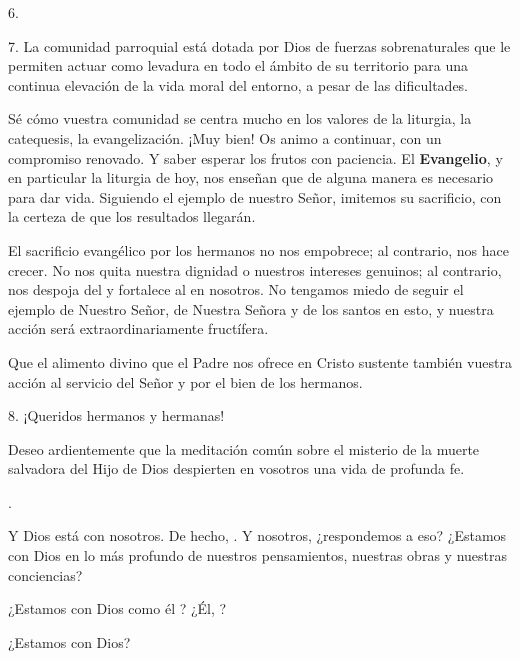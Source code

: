 \begin{body}
6. 

7. La comunidad parroquial está dotada por Dios de fuerzas sobrenaturales que le permiten actuar como levadura en todo el ámbito de su territorio para una continua elevación de la vida moral del entorno, a pesar de las dificultades.

Sé cómo vuestra comunidad se centra mucho en los valores de la liturgia, la catequesis, la evangelización. ¡Muy bien! Os animo a continuar, con un compromiso renovado. Y saber esperar los frutos con paciencia. El \textbf{Evangelio}, y en particular la liturgia de hoy, nos enseñan que de alguna manera es necesario  para dar vida. Siguiendo el ejemplo de nuestro Señor, imitemos su sacrificio, con la certeza de que los resultados llegarán.

El sacrificio evangélico por los hermanos no nos empobrece; al contrario, nos hace crecer. No nos quita nuestra dignidad o nuestros intereses genuinos; al contrario, nos despoja del  y fortalece al  en nosotros. No tengamos miedo de seguir el ejemplo de Nuestro Señor, de Nuestra Señora y de los santos en esto, y nuestra acción será extraordinariamente fructífera.

  Que el alimento divino que el Padre nos ofrece en Cristo sustente también vuestra acción al servicio del Señor y por el bien de los hermanos.

8. ¡Queridos hermanos y hermanas!

Deseo ardientemente que   la meditación común sobre el misterio de la muerte salvadora del Hijo de Dios despierten en vosotros una vida de profunda fe.

.

Y Dios está con nosotros. De hecho, . Y nosotros, ¿respondemos a eso? ¿Estamos con Dios en lo más profundo de nuestros pensamientos, nuestras obras y nuestras conciencias?

¿Estamos con Dios como él ? ¿Él, ?

¿Estamos con Dios?
\end{body}
